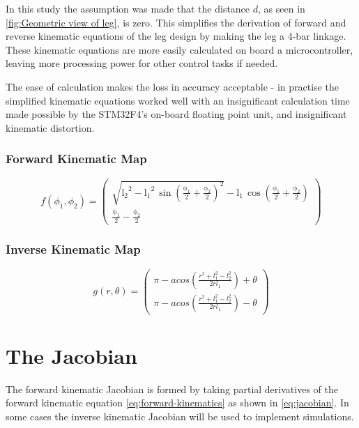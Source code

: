 In this study the assumption was made that the distance $d$, as seen in \cref{fig:Geometric view of leg}, is zero. This simplifies the derivation of forward and reverse kinematic equations of the leg design by making the leg a 4-bar linkage. These kinematic equations are more easily calculated on board a microcontroller\cite{Duperret}, leaving more processing power for other control tasks if needed. 

The ease of calculation makes the loss in accuracy acceptable - in practise the simplified kinematic equations worked well with an insignificant calculation time made possible by the STM32F4's on-board floating point unit, and insignificant kinematic distortion.

\subsubsection{Forward Kinematic Map}
\begin{equation} \label{eq:forward-kinematics}
f(\phi_1, \phi_2) = \left(\begin{array}{c} \sqrt{{\mathrm{l_2}}^2 - {\mathrm{l_1}}^2\, {\sin\!\left(\frac{\mathrm{\phi_1}}{2} + \frac{\mathrm{\phi_2}}{2}\right)}^2} - \mathrm{l_1}\, \cos\!\left(\frac{\mathrm{\phi_1}}{2} + \frac{\mathrm{\phi_2}}{2}\right)\\
\frac{\mathrm{\phi_1}}{2} - \frac{\mathrm{\phi_2}}{2} \end{array}\right)
\end{equation}

\subsubsection{Inverse Kinematic Map}
\begin{equation} \label{eq:reverse-kinematics}
g(r, \theta) = \left(\begin{array}{c} \pi - acos(\frac{r^2 + l_1^2 - l_2^2}{2rl_1}) + \theta \\
\pi - acos(\frac{r^2 + l_1^2 - l_2^2}{2rl_1}) - \theta  \end{array}\right)
\end{equation}

\section{The Jacobian}
\label{sec:The Jacobian}
The forward kinematic Jacobian is formed by taking partial derivatives of the forward kinematic equation \cref{eq:forward-kinematics} as shown in \cref{eq:jacobian}. In some cases the inverse kinematic Jacobian will be used to implement simulations.

